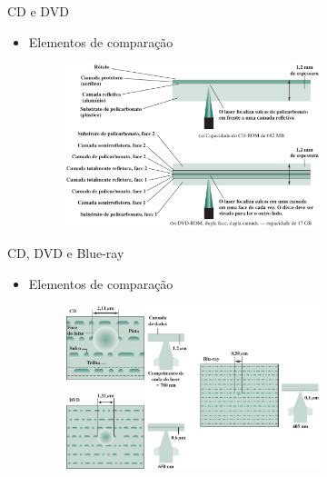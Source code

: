 \begin{slide}{CD e DVD}
	\begin{itemize}
		\item Elementos de comparação
			\begin{figure}
				\includegraphics[width = 0.7\textwidth]{figs/opt-cd-dvd}
			\end{figure}
	\end{itemize}
\end{slide}
\begin{slide}{CD, DVD e Blue-ray}
	\begin{itemize}
		\item Elementos de comparação
			\begin{figure}
				\includegraphics[width = 0.7\textwidth]{figs/opt-comp}
			\end{figure}
	\end{itemize}
\end{slide}

%
%
%
%

